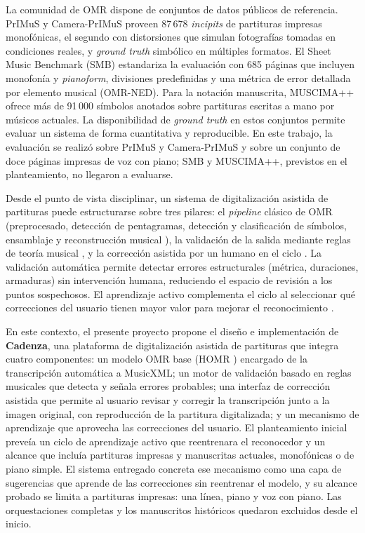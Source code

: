 \documentclass[conference]{IEEEtran}
\begin{document}
La comunidad de OMR dispone de conjuntos de datos públicos de referencia.
PrIMuS y Camera-PrIMuS \cite{calvo2018,cameraprimus2018} proveen 87\,678
\emph{incipits} de partituras impresas monofónicas, el segundo con
distorsiones que simulan fotografías tomadas en condiciones reales, y
\emph{ground truth} simbólico en múltiples formatos. El Sheet Music
Benchmark (SMB) \cite{smb2025} estandariza la evaluación con 685 páginas
que incluyen monofonía y \emph{pianoform}, divisiones predefinidas y una
métrica de error detallada por elemento musical (OMR-NED). Para la notación
manuscrita, MUSCIMA++ \cite{muscima2017} ofrece más de 91\,000 símbolos
anotados sobre partituras escritas a mano por músicos actuales. La
disponibilidad de \emph{ground truth} en estos conjuntos permite evaluar un
sistema de forma cuantitativa y reproducible. En este trabajo, la
evaluación se realizó sobre PrIMuS y Camera-PrIMuS y sobre un conjunto de
doce páginas impresas de voz con piano; SMB y MUSCIMA++, previstos en el
planteamiento, no llegaron a evaluarse.

Desde el punto de vista disciplinar, un sistema de digitalización
asistida de partituras puede estructurarse sobre tres pilares: el
\emph{pipeline} clásico de OMR (preprocesado, detección de pentagramas,
detección y clasificación de símbolos, ensamblaje y reconstrucción
musical \cite{omr2020}), la validación de la salida
mediante reglas de teoría musical \cite{cuthbert2010}, y la corrección
asistida por un humano en el ciclo \cite{amershi2014}. La validación
automática permite detectar errores estructurales (métrica, duraciones,
armaduras) sin intervención humana, reduciendo el espacio de revisión a
los puntos sospechosos. El aprendizaje activo complementa el ciclo al
seleccionar qué correcciones del usuario tienen mayor valor para mejorar
el reconocimiento \cite{settles2009}.

En este contexto, el presente proyecto propone el diseño e
implementación de \textbf{Cadenza}, una plataforma de digitalización
asistida de partituras que integra cuatro componentes: un modelo OMR base
(HOMR \cite{homr2024}) encargado de la transcripción automática a
MusicXML; un motor de validación basado en reglas musicales que detecta y
señala errores probables; una interfaz de corrección asistida que permite
al usuario revisar y corregir la transcripción junto a la imagen original,
con reproducción de la partitura digitalizada; y un mecanismo de
aprendizaje que aprovecha las correcciones del usuario. El planteamiento
inicial preveía un ciclo de aprendizaje activo que reentrenara el
reconocedor y un alcance que incluía partituras impresas y manuscritas
actuales, monofónicas o de piano simple. El sistema entregado concreta ese
mecanismo como una capa de sugerencias que aprende de las correcciones sin
reentrenar el modelo, y su alcance probado se limita a partituras
impresas: una línea, piano y voz con piano. Las orquestaciones completas y
los manuscritos históricos quedaron excluidos desde el inicio.
\end{document}
